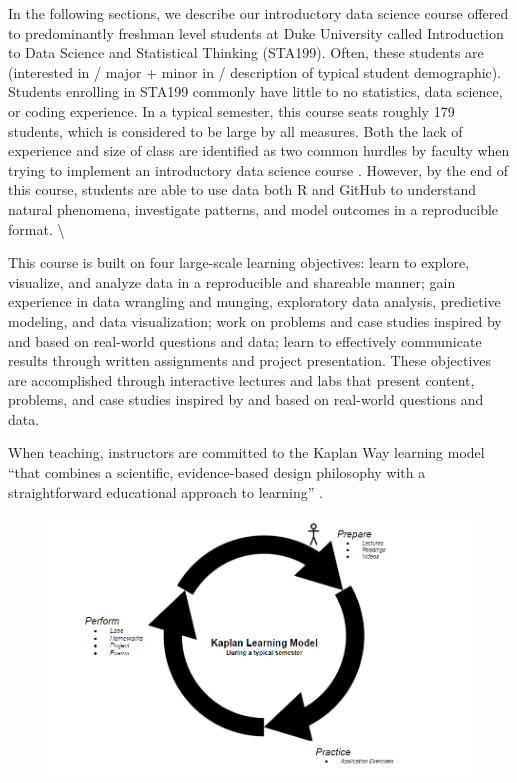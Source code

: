 \documentclass[
  12pt]{article}
\begin{document}
In the following sections, we describe our introductory data science
course offered to predominantly freshman level students at Duke
University called Introduction to Data Science and Statistical Thinking
(STA199). Often, these students are (interested in / major + minor in /
description of typical student demographic). Students enrolling in
STA199 commonly have little to no statistics, data science, or coding
experience. In a typical semester, this course seats roughly 179
students, which is considered to be large by all measures. Both the lack
of experience and size of class are identified as two common hurdles by
faculty when trying to implement an introductory data science course
\citep{Schwab2020, Kok_2008}. However, by the end of this course,
students are able to use data both R and GitHub to understand natural
phenomena, investigate patterns, and model outcomes in a reproducible
format. \textbackslash{}

This course is built on four large-scale learning objectives: learn to
explore, visualize, and analyze data in a reproducible and shareable
manner; gain experience in data wrangling and munging, exploratory data
analysis, predictive modeling, and data visualization; work on problems
and case studies inspired by and based on real-world questions and data;
learn to effectively communicate results through written assignments and
project presentation. These objectives are accomplished through
interactive lectures and labs that present content, problems, and case
studies inspired by and based on real-world questions and data.

When teaching, instructors are committed to the Kaplan Way learning
model ``that combines a scientific, evidence-based design philosophy
with a straightforward educational approach to learning'' \citep[pg.
3]{schweser_2023}.

\begin{figure}

{\centering \includegraphics{images/Kaplan.png}

}

\end{figure}
\end{document}
